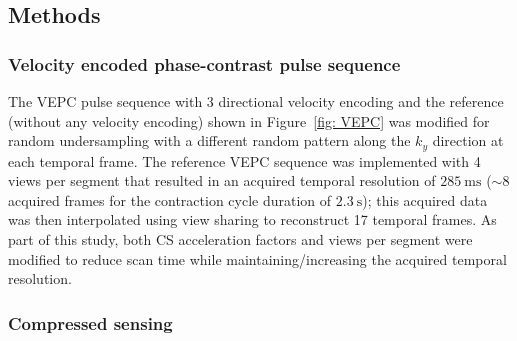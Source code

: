 \subsection{Methods}
\subsubsection{Velocity encoded phase-contrast pulse sequence}
The VEPC pulse sequence with 3 directional velocity encoding and the reference (without any velocity encoding) shown in Figure~\ref{fig: VEPC} was modified for random undersampling with a different random pattern along the $k_y$ direction at each temporal frame. 
The reference VEPC sequence was implemented with 4 views per segment that resulted in an acquired temporal resolution of $\SI{285}{\milli\second}$  ($\sim 8$ acquired frames for the contraction cycle duration of $\SI{2.3}{\second}$); this acquired data was then interpolated using view sharing to reconstruct 17 temporal frames. 
As part of this study, both CS acceleration factors and views per segment were modified to reduce scan time while maintaining/increasing the acquired temporal resolution.
\subsubsection{Compressed sensing}

